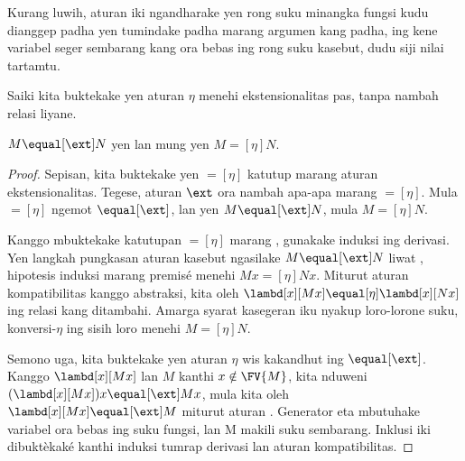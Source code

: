 \documentclass[../../../include/open-logic-section]{subfiles}
\begin{document}
Kurang luwih, aturan iki ngandharake
yen rong suku minangka fungsi kudu
dianggep padha yen tumindake padha
marang argumen kang padha, ing kene variabel seger sembarang kang ora bebas ing rong suku kasebut, dudu siji nilai tartamtu.

Saiki kita buktekake yen aturan
$\eta$ menehi ekstensionalitas
pas, tanpa nambah relasi liyane.

\begin{thm}
  $M \equal[\ext] N$ yen lan mung yen $M \equal[\eta] N$.
\end{thm}

\begin{proof}
  Sepisan, kita buktekake yen
  $\equal[\eta]$ katutup marang
  aturan ekstensionalitas. Tegese,
  aturan $\ext$ ora nambah apa-apa
  marang $\equal[\eta]$.
  Mula $\equal[\eta]$ ngemot
  $\equal[\ext]$, lan yen
  $M \equal[\ext] N$, mula
  $M \equal[\eta] N$.

  Kanggo mbuktekake katutupan
  $\equal[\eta]$ marang \ext,
  gunakake induksi ing derivasi.
  Yen langkah pungkasan aturan
  kasebut ngasilake $M
  \equal[\ext] N$ liwat \ext{},
  hipotesis
  induksi marang premisé menehi
  $Mx \equal[\eta] Nx$.
  Miturut aturan kompatibilitas
  kanggo abstraksi,
  kita oleh $\lambd[x][Mx]
  \equal[\eta] \lambd[x][Nx]$
  ing relasi kang ditambahi.
  Amarga syarat kasegeran iku
  nyakup loro-lorone
  suku, konversi-$\eta$ ing
  sisih loro menehi
  $M \equal[\eta] N$.

  Semono uga, kita buktekake
  yen aturan $\eta$ wis kakandhut
  ing $\equal[\ext]$.
  Kanggo $\lambd[x][Mx]$ lan
  $M$ kanthi $x \notin \FV{M}$,
  kita nduweni
  $(\lambd[x][Mx])x \equal[\ext] Mx$,
  mula kita oleh
  $\lambd[x][Mx] \equal[\ext] M$
  miturut aturan \ext{}. Generator eta mbutuhake variabel ora bebas ing suku fungsi, lan M makili suku sembarang. Inklusi iki dibuktèkaké kanthi induksi tumrap derivasi lan aturan kompatibilitas.
\end{proof}
\end{document}
